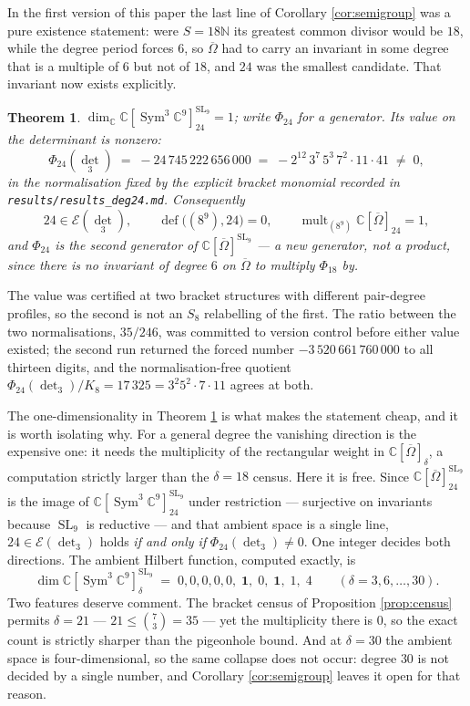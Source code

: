 \documentclass[11pt,reqno]{amsart}
\theoremstyle{plain}
\newtheorem{theorem}{Theorem}[section]
\theoremstyle{definition}
\DeclareMathOperator{\SL}{SL}
\DeclareMathOperator{\Sym}{Sym}
\DeclareMathOperator{\mult}{mult}
\DeclareMathOperator{\dfc}{def}
\newcommand{\cO}{\overline{\Omega}}
\newcommand{\bC}{\mathbb{C}}
\newcommand{\bN}{\mathbb{N}}
\begin{document}
In the first version of this paper the last line of Corollary
\ref{cor:semigroup} was a pure existence statement: were $S=18\bN$ its greatest
common divisor would be $18$, while the degree period forces $6$, so $\cO$ had
to carry an invariant in some degree that is a multiple of $6$ but not of $18$,
and $24$ was the smallest candidate.  That invariant now exists explicitly.

\begin{theorem}\label{thm:deg24}
$\dim_\bC\bC[\Sym^3\bC^9]^{\SL_9}_{24}=1$; write $\Phi_{24}$ for a generator.
Its value on the determinant is nonzero:
\begin{equation}\label{eq:value24}
  \Phi_{24}(\det_3)\;=\;-24\,745\,222\,656\,000
  \;=\;-2^{12}\,3^{7}\,5^{3}\,7^{2}\cdot11\cdot41\;\neq\;0 ,
\end{equation}
in the normalisation fixed by the explicit bracket monomial recorded in
\texttt{results/results\_deg24.md}.  Consequently
\[
  24\in\mathcal E(\det_3),\qquad \dfc\big((8^{9}),24\big)=0,\qquad
  \mult_{(8^{9})}\bC[\cO]_{24}=1 ,
\]
and $\Phi_{24}$ is the second generator of $\bC[\cO]^{\SL_9}$ --- a new
generator, not a product, since there is no invariant of degree $6$ on $\cO$ to
multiply $\Phi_{18}$ by.
\end{theorem}

The value was certified at two bracket structures with different pair-degree
profiles, so the second is not an $S_8$ relabelling of the first.  The ratio
between the two normalisations, $35/246$, was committed to version control
before either value existed; the second run returned the forced number
$-3\,520\,661\,760\,000$ to all thirteen digits, and the normalisation-free
quotient $\Phi_{24}(\det_3)/K_8=17\,325=3^{2}5^{2}\cdot7\cdot11$ agrees at
both.

The one-dimensionality in Theorem \ref{thm:deg24} is what makes the statement
cheap, and it is worth isolating why.  For a general degree the vanishing
direction is the expensive one: it needs the multiplicity of the rectangular
weight in $\bC[\cO]_\delta$, a computation strictly larger than the
$\delta=18$ census.  Here it is free.  Since
$\bC[\cO]^{\SL_9}_{24}$ is the image of $\bC[\Sym^3\bC^9]^{\SL_9}_{24}$ under
restriction --- surjective on invariants because $\SL_9$ is reductive --- and
that ambient space is a single line, $24\in\mathcal E(\det_3)$ holds
\emph{if and only if} $\Phi_{24}(\det_3)\neq0$.  One integer decides both
directions.  The ambient Hilbert function, computed exactly, is
\[
  \dim\bC[\Sym^3\bC^9]^{\SL_9}_\delta \;=\;
  0,0,0,0,0,\;\mathbf 1,\;0,\;\mathbf 1,\;1,\;4
  \qquad(\delta=3,6,\dots,30).
\]
Two features deserve comment.  The bracket census of Proposition
\ref{prop:census} permits $\delta=21$ --- $21\le\binom73=35$ --- yet the
multiplicity there is $0$, so the exact count is strictly sharper than the
pigeonhole bound.  And at $\delta=30$ the ambient space is four-dimensional, so
the same collapse does not occur: degree $30$ is not decided by a single number,
and Corollary \ref{cor:semigroup} leaves it open for that reason.
\end{document}
